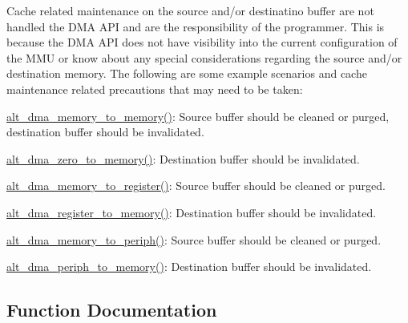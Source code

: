 Cache related maintenance on the source and/or destinatino buffer are not handled the D\+MA A\+PI and are the responsibility of the programmer. This is because the D\+MA A\+PI does not have visibility into the current configuration of the M\+MU or know about any special considerations regarding the source and/or destination memory. The following are some example scenarios and cache maintenance related precautions that may need to be taken\+:
\begin{DoxyItemize}
\item \mbox{\hyperlink{group__ALT__DMA__STD__OPS_ga98eaff0bc9e6fa81379866be85c79a80}{alt\+\_\+dma\+\_\+memory\+\_\+to\+\_\+memory()}}\+: Source buffer should be cleaned or purged, destination buffer should be invalidated.
\item \mbox{\hyperlink{group__ALT__DMA__STD__OPS_gaecb95fceaec7eb79dac11e99653810f2}{alt\+\_\+dma\+\_\+zero\+\_\+to\+\_\+memory()}}\+: Destination buffer should be invalidated.
\item \mbox{\hyperlink{group__ALT__DMA__STD__OPS_ga1f8c3b178c6273d7d0da2ac6e60a6a3f}{alt\+\_\+dma\+\_\+memory\+\_\+to\+\_\+register()}}\+: Source buffer should be cleaned or purged.
\item \mbox{\hyperlink{group__ALT__DMA__STD__OPS_ga8539a5c42c3f59b8640252d203398962}{alt\+\_\+dma\+\_\+register\+\_\+to\+\_\+memory()}}\+: Destination buffer should be invalidated.
\item \mbox{\hyperlink{group__ALT__DMA__STD__OPS_gab857a70be266b57b97d4dab000dfbaff}{alt\+\_\+dma\+\_\+memory\+\_\+to\+\_\+periph()}}\+: Source buffer should be cleaned or purged.
\item \mbox{\hyperlink{group__ALT__DMA__STD__OPS_gaf55eeadb952bd684afb3ffafcc938597}{alt\+\_\+dma\+\_\+periph\+\_\+to\+\_\+memory()}}\+: Destination buffer should be invalidated. 
\end{DoxyItemize}

\subsection{Function Documentation}
\mbox{\label{group__ALT__DMA__STD__OPS_ga98eaff0bc9e6fa81379866be85c79a80}} 

